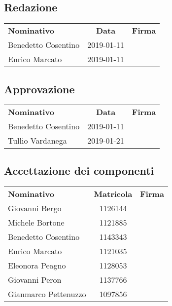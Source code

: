 \subsection{Redazione}

{\renewcommand{\arraystretch}{1.4}%
\begin{table}[h]
	\centering
	\begin{tabular}{| l | c | >{\centering\arraybackslash}m{8cm}
			|} 
		\rowcolor{LightBlue}
		\textbf{\color{white}Nominativo} & 
		\textbf{\color{white}Data} & 
		\textbf{\color{white}Firma} \\
	
	Benedetto Cosentino & 2019-01-11 & \\
	Enrico Marcato & 2019-01-11 & \\ \hline
\end{tabular}
\end{table}
}
\subsection{Approvazione}
{\renewcommand{\arraystretch}{1.4}%
\begin{table}[h]
	\centering
	\begin{tabular}{| l | c | >{\centering\arraybackslash}m{8cm}
			|} 
	\rowcolor{LightBlue}
	\textbf{\color{white}Nominativo} & 
	\textbf{\color{white}Data} & 
	\textbf{\color{white}Firma} \\
	
	Benedetto Cosentino & 2019-01-11 & \\
	Tullio Vardanega & 2019-01-21 & \\ \hline
\end{tabular}
\end{table}
}

\subsection{Accettazione dei componenti}
{\renewcommand{\arraystretch}{1.4}%
\begin{table}[h]
	\centering
\begin{tabular}{| l | c | >{\centering\arraybackslash}m{8cm}
		|} 
	\rowcolor{LightBlue}

	\textbf{\color{white}Nominativo} & 
	\textbf{\color{white}Matricola} & 
	\textbf{\color{white}Firma} \\

	Giovanni Bergo & 1126144 & \\
	Michele Bortone & 1121885 & \\
	Benedetto Cosentino & 1143343 & \\	
	Enrico Marcato & 1121035 & \\
	Eleonora Peagno & 1128053 & \\
	Giovanni Peron & 1137766 & \\
	Gianmarco Pettenuzzo & 1097856 & \\ \hline
\end{tabular}
\end{table}
}
